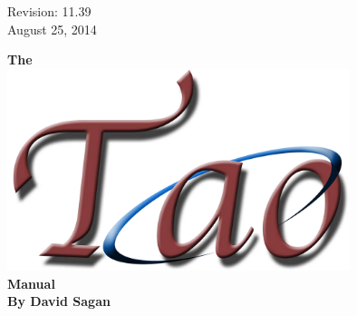 \thispagestyle{empty}

\begin{flushright}
\large
  Revision: 11.39 \\
  August 25, 2014 \\
\end{flushright}

\vfill


{
\begin{center}
{\Huge \sf\bf The} \\
\vskip 0.1in
\includegraphics[width=10cm]{tao-logo.pdf} \\
\vskip 0.1in
{\Huge \sf\bf Manual} \\
\vskip 0.4in
{\Large \sf\bf By David Sagan} \\
\end{center}
}

\vfill
\break
